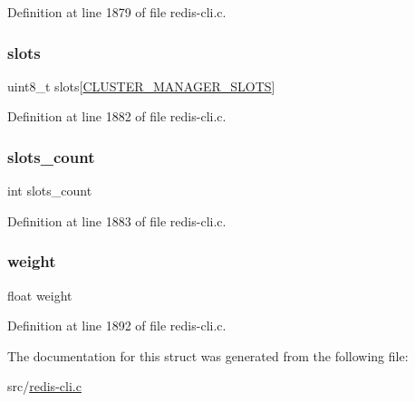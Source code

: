 Definition at line 1879 of file redis-\/cli.\+c.

\mbox{\label{structcluster_manager_node_a6f06905b827dc0f8fb569761fb55cab6}} 
\subsubsection{\texorpdfstring{slots}{slots}}
{\footnotesize\ttfamily uint8\+\_\+t slots\mbox{[}\hyperlink{redis-cli_8c_adff5eca00afc90a8c3c213bb7100cdc0}{C\+L\+U\+S\+T\+E\+R\+\_\+\+M\+A\+N\+A\+G\+E\+R\+\_\+\+S\+L\+O\+TS}\mbox{]}}



Definition at line 1882 of file redis-\/cli.\+c.

\mbox{\label{structcluster_manager_node_ac71d8fbda6f0a3ab58593d31114de67a}} 
\subsubsection{\texorpdfstring{slots\+\_\+count}{slots\_count}}
{\footnotesize\ttfamily int slots\+\_\+count}



Definition at line 1883 of file redis-\/cli.\+c.

\mbox{\label{structcluster_manager_node_a8128625c9e3fd04c27b82957732d8781}} 
\subsubsection{\texorpdfstring{weight}{weight}}
{\footnotesize\ttfamily float weight}



Definition at line 1892 of file redis-\/cli.\+c.



The documentation for this struct was generated from the following file\+:\begin{DoxyCompactItemize}
\item 
src/\hyperlink{redis-cli_8c}{redis-\/cli.\+c}\end{DoxyCompactItemize}

